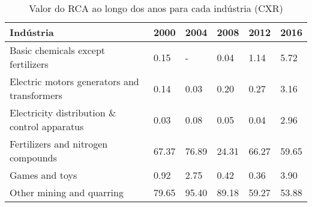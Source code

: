 \begin{table}
\centering
\caption{Valor do RCA ao longo dos anos para cada indústria (CXR)}
\label{tab:ex3-tempo-CXR}
\begin{tabular}{p{6cm}p{1.5cm}p{1.5cm}p{1.5cm}p{1.5cm}p{1.5cm}}
\toprule
                                   Indústria &  2000 &  2004 &  2008 &  2012 &  2016 \\
\midrule
          Basic chemicals except fertilizers &  0.15 &     - &  0.04 &  1.14 &  5.72 \\
 Electric motors generators and transformers &  0.14 &  0.03 &  0.20 &  0.27 &  3.16 \\
Electricity distribution \& control apparatus &  0.03 &  0.08 &  0.05 &  0.04 &  2.96 \\
          Fertilizers and nitrogen compounds & 67.37 & 76.89 & 24.31 & 66.27 & 59.65 \\
                              Games and toys &  0.92 &  2.75 &  0.42 &  0.36 &  3.90 \\
                   Other mining and quarring & 79.65 & 95.40 & 89.18 & 59.27 & 53.88 \\
\bottomrule
\end{tabular}
\end{table}
